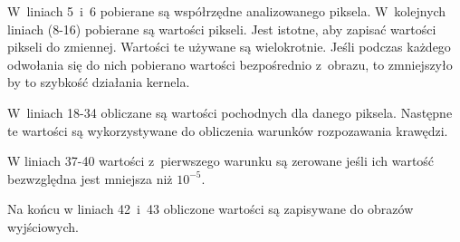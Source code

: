 W~liniach 5~i~6 pobierane są współrzędne analizowanego piksela. W~kolejnych liniach (8-16) pobierane są wartości pikseli. Jest istotne, aby zapisać wartości pikseli do zmiennej. Wartości te używane są wielokrotnie. Jeśli podczas każdego odwołania się do nich pobierano wartości bezpośrednio z~obrazu, to zmniejszyło by to szybkość działania kernela.

W~liniach 18-34 obliczane są wartości pochodnych dla danego piksela. Następne te wartości są wykorzystywane do  obliczenia warunków rozpozawania krawędzi.

W liniach 37-40 wartości z~pierwszego warunku są zerowane jeśli ich wartość bezwzględna jest mniejsza niż $  10^{-5} $.

Na końcu w liniach 42~i~43 obliczone wartości są zapisywane do obrazów wyjściowych.